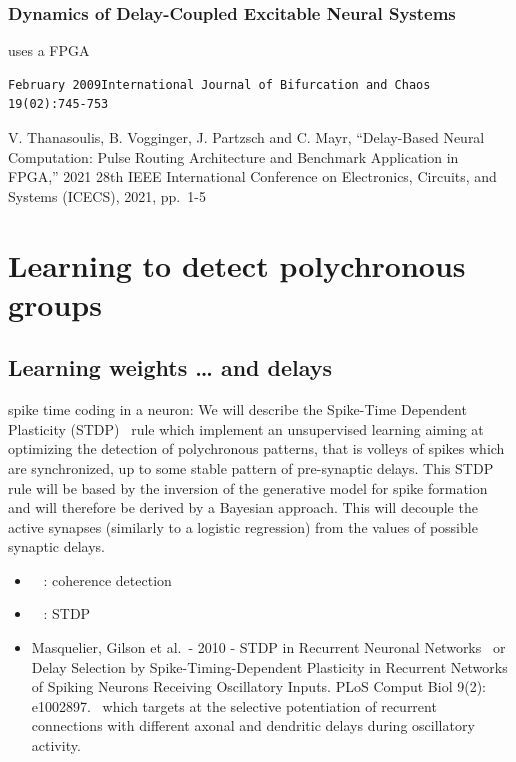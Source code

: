 \documentclass[brainsci, %
               review,submit,pdftex,moreauthors%
               ]{Definitions/mdpi}
\begin{document}
\subsubsection{Dynamics of Delay-Coupled Excitable Neural Systems}
uses a FPGA
~\citep{dahlem_dynamics_2009}

\begin{verbatim}
February 2009International Journal of Bifurcation and Chaos 19(02):745-753
\end{verbatim}

V. Thanasoulis, B. Vogginger, J. Partzsch and C. Mayr, ``Delay-Based Neural Computation: Pulse Routing Architecture and Benchmark Application in FPGA,'' 2021 28th IEEE International Conference on Electronics, Circuits, and Systems (ICECS), 2021, pp.~1-5
~\citep{thanasoulis_delay-based_2021}

\section{Learning to detect polychronous groups}\label{learning-to-detect-polychronous-groups}
\subsection{Learning weights \ldots{} and delays}\label{learning-weights-and-delays}
spike time coding in a neuron: We will describe the Spike-Time Dependent Plasticity (STDP)~\citep{markram_regulation_1997} rule which implement an unsupervised learning aiming at optimizing the detection of polychronous patterns, that is volleys of spikes which are synchronized, up to some stable pattern of pre-synaptic delays. This STDP rule will be based by the inversion of the generative model for spike formation and will therefore be derived by a Bayesian approach. This will decouple the active synapses (similarly to a logistic regression) from the values of possible synaptic delays.

\begin{itemize}
 \item
 ~\citep{perrinet_coherence_2002} : coherence detection
\item
 ~\citep{perrinet_networks_2001} : STDP
\item
  Masquelier, Gilson et al.~- 2010 - STDP in Recurrent Neuronal Networks~\citep{gilson_stdp_2010} or Delay Selection by Spike-Timing-Dependent Plasticity in Recurrent Networks of Spiking Neurons Receiving Oscillatory Inputs. PLoS Comput Biol 9(2): e1002897.~\citep{kerr_delay_2013} which targets at the selective potentiation of recurrent connections with different axonal and dendritic delays during oscillatory activity.
\end{itemize}
\end{document}
